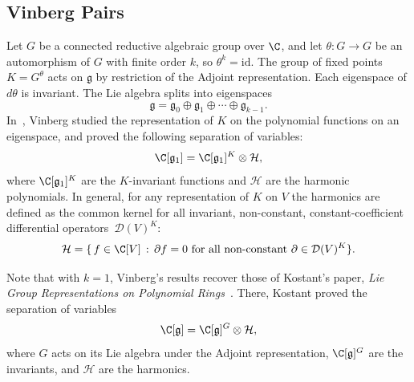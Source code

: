 \subsection{Vinberg Pairs}
Let $G$ be a connected reductive algebraic group over $\C$, and let $\theta:G\to G$ be an automorphism of $G$ with finite order $k$, so $\theta^k = \text{id}$. The group of fixed points $K = G^\theta$ acts on $\mathfrak{g}$ by restriction of the Adjoint representation. Each eigenspace of $d\theta$ is invariant. The Lie algebra splits into eigenspaces
\begin{equation*}
    \mathfrak{g} = \mathfrak{g}_0 \oplus \mathfrak{g}_1 \oplus \cdots \oplus \mathfrak{g}_{k-1}.
\end{equation*}
In~\cite{Vinberg1976}, Vinberg studied the representation of $K$ on the polynomial functions on an eigenspace, and proved the following separation of variables:
\begin{equation*}
    \C[\mathfrak{g}_1] = \C[\mathfrak{g}_1]^K \otimes \mathcal{H},
\end{equation*}
where $\C[\mathfrak{g}_1]^K$ are the $K$-invariant functions and $\mathcal{H}$ are the harmonic polynomials. In general, for any representation of $K$ on $V$ the harmonics are defined as the common kernel for all invariant, non-constant, constant-coefficient differential operators~$\mathcal{D}(V)^K$:
\begin{equation*}
    \mathcal{H} = \{ \, f \in \C[V] \, : \, \partial f = 0 \text{ for all non-constant } \partial \in \mathcal{D}(V)^K \}.
\end{equation*}

Note that with $k=1$, Vinberg's results recover those of Kostant's paper, \textit{Lie Group Representations on Polynomial Rings}~\cite{Kostant1963}. There, Kostant proved the separation of variables
\begin{equation*}
    \C[\mathfrak{g}] = \C[\mathfrak{g}]^G \otimes \mathcal{H},
\end{equation*}
where $G$ acts on its Lie algebra under the Adjoint representation, $\C[\mathfrak{g}]^G$ are the invariants, and $\mathcal{H}$ are the harmonics. 

